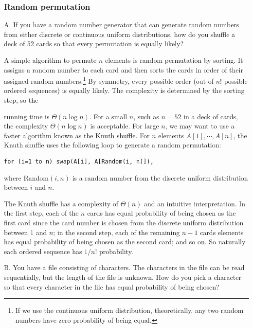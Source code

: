 \subsubsection*{Random permutation}

\begin{problem}{A. If you have a random number generator that can generate random numbers from either discrete or continuous uniform distributions, how do you shuffle a deck of 52 cards so that every permutation is equally likely?}
\end{problem}

\begin{solution}
A simple algorithm to permute $n$ elements is random permutation by sorting. It assigns a
random number to each card and then sorts the cards in order of their assigned random
numbers.\footnote[4]{If we use the continuous uniform distribution, theoretically, any two random numbers have zero probability of being equal.} By symmetry, every possible order (out of $n!$
possible ordered sequences) is equally likely. The complexity is determined by the sorting
step, so the


running time is $\Theta(n\log n)$. For a small $n$, such as $n=52$ in a deck of cards, the
complexity $\Theta(n\log n)$ is acceptable. For large $n$, we may want to use a faster algorithm
known as the Knuth shuffle. For $n$ elements $A[1],\cdots,A[n]$, the Knuth shuffle uses the
following loop to generate a random permutation:

\begin{verbatim}
for (i=1 to n) swap(A[i], A[Random(i, n)]),
\end{verbatim}

where Random$(i,n)$ is a random number from the discrete uniform distribution between $i$
and $n$.

The Knuth shuffle has a complexity of $\Theta(n)$ and an intuitive interpretation. In the
first step, each of the $n$ cards has equal probability of being chosen as the first card
since the card number is chosen from the discrete uniform distribution between 1 and $n$;
in the second step, each of the remaining $n-1$ cards elements has equal probability of being
chosen as the second card; and so on. So naturally each ordered sequence has $1/n!$
probability.

\end{solution}

\begin{problem}{B. You have a file consisting of characters. The characters in the file can be read sequentially, but the length of the file is unknown. How do you pick a character so that every character in the file has equal probability of being chosen?}
\end{problem}

